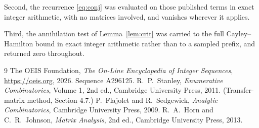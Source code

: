 \documentclass[11pt,a4paper]{article}
\theoremstyle{plain}
\theoremstyle{definition}
\begin{document}
Second, the recurrence \eqref{eq:conj} was evaluated on those published terms in exact
integer arithmetic, with no matrices involved, and vanishes wherever it applies.

Third, the annihilation test of Lemma~\ref{lem:crit} was carried to the full
Cayley--Hamilton bound in exact integer arithmetic rather than to a sampled prefix, and
returned zero throughout.

\begin{thebibliography}{9}
 The OEIS Foundation, \emph{The On-Line Encyclopedia of Integer
Sequences}, \url{https://oeis.org}, 2026. Sequence A296125.
 R.~P.~Stanley, \emph{Enumerative Combinatorics}, Volume 1, 2nd ed.,
Cambridge University Press, 2011. (Transfer-matrix method, Section 4.7.)
 P.~Flajolet and R.~Sedgewick, \emph{Analytic Combinatorics}, Cambridge
University Press, 2009.
 R.~A.~Horn and C.~R.~Johnson, \emph{Matrix Analysis}, 2nd ed., Cambridge
University Press, 2013.
\end{thebibliography}
\end{document}
